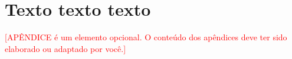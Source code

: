 \chapter{Texto texto texto}
\label{chap:ANEXO}

\textcolor{red}{[APÊNDICE é um elemento opcional. O conteúdo dos apêndices deve ter sido elaborado ou adaptado por você.]}

